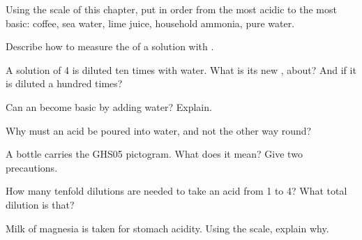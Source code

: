 \begin{exercise}[$\star$]\label{exo:g9:acids-bases-ph:3}
Using the  scale of this chapter, put in order from the most acidic to
the most basic: coffee, sea water, lime juice, household ammonia, pure
water.
\end{exercise}

\begin{exercise}[$\star$]\label{exo:g9:acids-bases-ph:4}
Describe how to measure the  of a solution with .
\end{exercise}

\begin{exercise}[$\star\star$]\label{exo:g9:acids-bases-ph:5}
A solution of  4 is diluted ten times with water. What is its new ,
about? And if it is diluted a hundred times?
\end{exercise}

\begin{exercise}[$\star\star$]\label{exo:g9:acids-bases-ph:6}
Can an  become basic by adding water? Explain.
\end{exercise}

\begin{exercise}[$\star\star$]\label{exo:g9:acids-bases-ph:7}
Why must an acid be poured into water, and not the other way round?
\end{exercise}

\begin{exercise}[$\star\star$]\label{exo:g9:acids-bases-ph:8}
A bottle carries the GHS05 pictogram. What does it mean? Give two
precautions.
\end{exercise}

\begin{exercise}[$\star\star$]\label{exo:g9:acids-bases-ph:9}
How many tenfold dilutions are needed to take an acid from  1 to
 4? What total dilution is that?
\end{exercise}

\begin{exercise}[$\star\star$]\label{exo:g9:acids-bases-ph:10}
Milk of magnesia is taken for stomach acidity. Using the  scale,
explain why.
\end{exercise}

